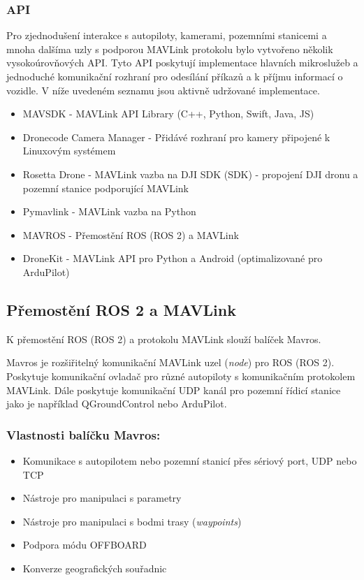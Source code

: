 \subsubsection{API}

Pro zjednodušení interakce s autopiloty, kamerami, pozemními stanicemi a mnoha dalšíma uzly s podporou MAVLink protokolu bylo vytvořeno několik vysokoúrovňových \acs{API}. Tyto \acs{API} poskytují implementace hlavních mikroslužeb a jednoduché komunikační rozhraní pro odesílání příkazů a k příjmu informací o vozidle. V níže uvedeném seznamu jsou aktivně udržované implementace.

\begin{itemize}
    \item MAVSDK - MAVLink API Library (C++, Python, Swift, Java, JS) 
    \item Dronecode Camera Manager - Přidávé rozhraní pro kamery připojené k Linuxovým systémem
    \item Rosetta Drone - MAVLink vazba na DJI \acs{SDK} (\acl{SDK}) - propojení DJI dronu a pozemní stanice podporující MAVLink
    \item Pymavlink - MAVLink vazba na Python
    \item MAVROS - Přemostění ROS (ROS 2) a MAVLink
    \item DroneKit - MAVLink API pro Python a Android (optimalizované pro ArduPilot)
\end{itemize}

\subsection{Přemostění ROS 2 a MAVLink}

K přemostění ROS (ROS 2) a protokolu MAVLink slouží balíček Mavros. \cite{MAVROS}

Mavros je rozšiřitelný komunikační MAVLink uzel (\textit{node}) pro ROS (ROS 2). Poskytuje komunikační ovladač pro různé autopiloty s komunikačním protokolem MAVLink. Dále poskytuje komunikační UDP kanál pro pozemní řídicí stanice jako je například QGroundControl nebo ArduPilot.

\subsubsection{Vlastnosti balíčku Mavros:}

\begin{itemize}
    \item Komunikace s autopilotem nebo pozemní stanicí přes sériový port, UDP nebo TCP
    \item Nástroje pro manipulaci s parametry
    \item Nástroje pro manipulaci s bodmi trasy (\textit{waypoints})
    \item Podpora módu OFFBOARD
    \item Konverze geografických souřadnic
\end{itemize}

